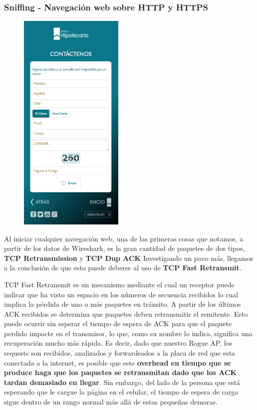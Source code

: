 \subsubsection{Sniffing - Navegación web sobre HTTP y HTTPS}

\begin{figure}
    \centering
    \includegraphics[width=5cm]{img/hipotecario.png}
\end{figure}

Al iniciar cualquier navegación web, una de las primeras cosas que notamos, a partir de los datos de Wireshark, es la gran cantidad de paquetes 
de dos tipos, \textbf{TCP Retransmission} y \textbf{TCP Dup ACK} Investigando un poco más, llegamos a la conclusión de que esto puede deberse al uso 
de \textbf{TCP Fast Retransmit}. 

TCP Fast Retransmit es un mecanismo mediante el cual un receptor puede indicar que ha visto un espacio en los números de secuencia recibidos lo cual 
implica la pérdida de uno o más paquetes en tránsito. A partir de los últimos ACK recibidos se determina que paquetes deben retransmitir el remitente. 
Esto puede ocurrir sin esperar el tiempo de espera de ACK para que el paquete perdido impacte en el transmisor, lo que, como su nombre lo indica, significa 
una recuperación mucho más rápida. Es decir, dado que nuestro Rogue AP, los requests son recibidos, analizados y forwardeados a la placa de red que esta 
conectada a la internet, es posible que este \textbf{overhead en tiempo que se produce haga que los paquetes se retransmitan dado que los ACK tardan demasiado en 
llegar}. Sin embargo, del lado de la persona que está esperando que le cargue la página en el celular, el tiempo de espera de carga sigue dentro de un rango 
normal más allá de estas pequeñas demoras.

